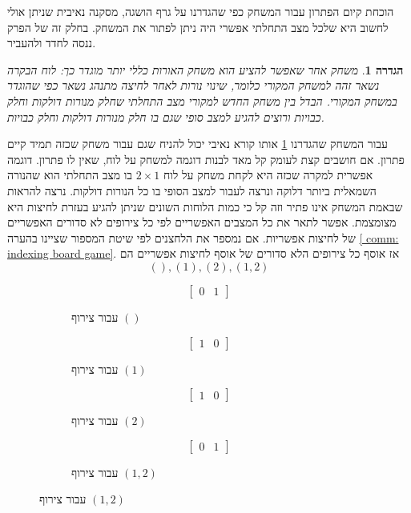 \documentclass[12pt,leqno]{article}
\theoremstyle{theoremdd}
\newtheorem{definition}{הגדרה}[section]
\begin{document}
הוכחת קיום הפתרון עבור המשחק כפי שהגדרנו  על גרף הושגה, מסקנה נאיבית שניתן אולי לחשוב היא שלכל מצב התחלתי
אפשרי היה ניתן לפתור את המשחק. בחלק זה של הפרק ננסה לחדד ולהעביר.
\begin{definition}
    \label{def:diff-game}
    משחק אחר שאפשר להציע הוא משחק האורות כללי יותר מוגדר כך:
    לוח הבקרה נשאר זהה למשחק המקורי כלומר, שינוי נורות 
    לאחר לחיצה מתנהג נשאר כפי שהוגדר במשחק המקורי.
    הבדל בין משחק החדש למקורי 
    מצב התחלתי שחלק מנורות דולקות וחלק כבויות ורוצים להגיע למצב סופי שגם בו חלק מנורות דולקות וחלק כבויות.
\end{definition}
עבור המשחק שהגדרנו 
\ref{def:diff-game}
אותו קורא נאיבי יכול להניח שגם עבור משחק שכזה תמיד קיים פתרון.
אם חושבים קצת לעומק קל מאד לבנות דוגמה למשחק על לוח, שאין לו פתרון.
דוגמה אפשרית למקרה שכזה היא לקחת משחק על לוח 
$2 \times 1$
בו מצב התחלתי הוא שהנורה השמאלית ביותר דלוקה ונרצה לעבור למצב הסופי בו כל 
הנורות דולקות.
נרצה להראות שבאמת המשחק אינו פתיר וזה קל כי כמות 
הלוחות השונים שניתן להגיע בעזרת לחיצות היא מצומצמת.
אפשר לתאר את כל המצבים האפשריים לפי 
כל צירופים לא סדורים האפשריים של לחיצות אפשריות.
אם נמספר את הלחצנים לפי שיטת המספור שציינו בהערה 
\ref{ comm: indexing board game}.
אז אוסף כל צירופים הלא סדורים 
של אוסף לחיצות אפשריים הם 
\[
    (), (1), (2), (1,2)
\]
\begin{figure}[ht]
    \caption{מצבי הלוחות לאחר לחיצה של צירוף}
    \centering
    \begin{subfigure}{.20\textwidth}
        \caption{
            עבור צירוף
            $()$
        }
        \[
            \begin{bmatrix}
                0 & 1
            \end{bmatrix}
        \]
    \end{subfigure}
    \begin{subfigure}{.20\textwidth}
        \caption{
            עבור צירוף
            $(1)$
        }
        \[
            \begin{bmatrix}
                1 & 0
            \end{bmatrix}
        \]
    \end{subfigure}
    \begin{subfigure}{.20\textwidth}
        \caption{
            עבור צירוף
            $(2)$
        }
        \[
            \begin{bmatrix}
                1 & 0
            \end{bmatrix}
        \]
    \end{subfigure}
    \begin{subfigure}{.20\textwidth}
        \caption{
            עבור צירוף
            $(1, 2)$
        }
        \[
            \begin{bmatrix}
                0 & 1
            \end{bmatrix}
        \]
    \end{subfigure}%
\end{figure}
\end{document}
